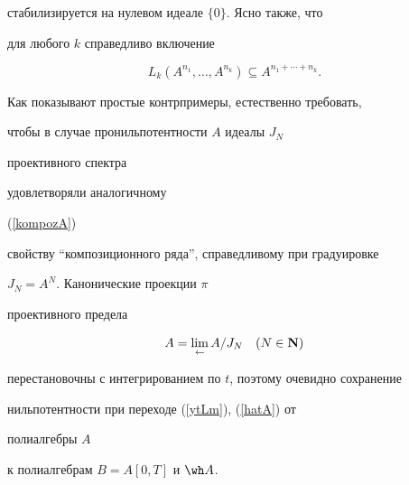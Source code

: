 стабилизируется на нулевом идеале $\{0\}$. Ясно также, что


для любого $k$ справедливо включение


\begin{equation}


\label{kompozA}


L_k(A^{n_1},\dotsc,A^{n_k})\subseteq A^{n_1+\dotsb+n_k}.


\end{equation}


Как показывают простые контрпримеры, естественно требовать,


чтобы в случае пронильпотентности $A$ идеалы $J_N$


проективного спектра


удовлетворяли аналогичному


(\ref{kompozA})


свойству ``композиционного ряда'', справедливому при градуировке


$J_N=A^N$. Канонические проекции $\pi$


проективного предела


\begin{equation}


\label{proektlim}


A=\lim\limits_{\leftarrow}A/J_N \quad (N\in{\bold{N}})


\end{equation}


перестановочны с интегрированием по $t$, поэтому очевидно сохранение


нильпотентности при переходе (\ref{ytLm}), (\ref{hatA}) от


полиалгебры $A$


к полиалгебрам $B=A[0,T]$ и $\wh A$.






